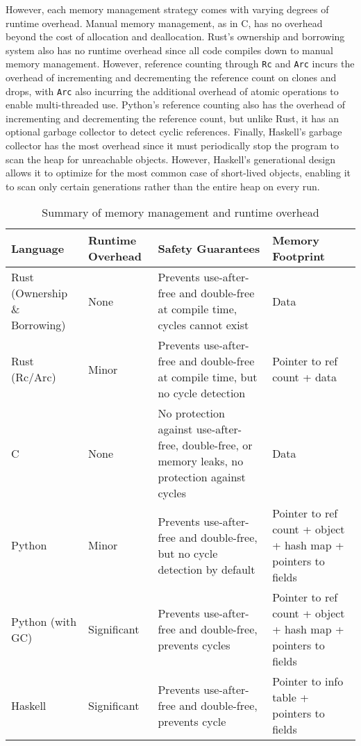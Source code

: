 \documentclass[12pt, letterpaper]{article}
\begin{document}
However, each memory management strategy comes with varying degrees of runtime overhead. Manual memory management, as in C, has no overhead beyond the cost of allocation and deallocation. Rust's ownership and borrowing system also has no runtime overhead since all code compiles down to manual memory management. However, reference counting through \texttt{Rc} and \texttt{Arc} incurs the overhead of incrementing and decrementing the reference count on clones and drops, with \texttt{Arc} also incurring the additional overhead of atomic operations to enable multi-threaded use. Python's reference counting also has the overhead of incrementing and decrementing the reference count, but unlike Rust, it has an optional garbage collector to detect cyclic references. Finally, Haskell's garbage collector has the most overhead since it must periodically stop the program to scan the heap for unreachable objects. However, Haskell's generational design allows it to optimize for the most common case of short-lived objects, enabling it to scan only certain generations rather than the entire heap on every run.
\begin{table}[H]
	\centering
	\begin{tabular}{p{2cm}|p{2cm}|p{4cm}|p{4cm}}
		Language                      & Runtime Overhead & Safety Guarantees                                                                                & Memory Footprint                                              \\
		\hline
		Rust (Ownership \& Borrowing) & None             & Prevents use-after-free and double-free at compile time, cycles cannot exist                     & Data                                                          \\
		\hline
		Rust (Rc/Arc)                 & Minor            & Prevents use-after-free and double-free at compile time, but no cycle detection                  & Pointer to ref count + data                                   \\
		\hline
		C                             & None             & No protection against use-after-free, double-free, or memory leaks, no protection against cycles & Data                                                          \\
		\hline
		Python                        & Minor            & Prevents use-after-free and double-free, but no cycle detection by default                       & Pointer to ref count + object + hash map + pointers to fields \\
		\hline
		Python (with GC)              & Significant      & Prevents use-after-free and double-free, prevents cycles                                         & Pointer to ref count + object + hash map + pointers to fields \\
		\hline
		Haskell                       & Significant      & Prevents use-after-free and double-free, prevents cycle                                          & Pointer to info table + pointers to fields                    \\
	\end{tabular}
	\caption{Summary of memory management and runtime overhead}
\end{table}
\end{document}

